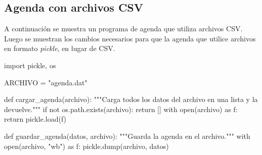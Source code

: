 \newpage
\begin{subappendices}
\section{Agenda con archivos CSV}

A continuación se muestra un programa de agenda que utiliza archivos
CSV\@. Luego se muestran los cambios necesarios para que la agenda que utilice archivos
en formato \emph{pickle}, en lugar de CSV.



\begin{codigo-python}
import pickle, os

ARCHIVO = "agenda.dat"

def cargar_agenda(archivo):
    """Carga todos los datos del archivo en una lista y la devuelve."""
    if not os.path.exists(archivo):
        return []
    with open(archivo) as f:
        return pickle.load(f)

def guardar_agenda(datos, archivo):
    """Guarda la agenda en el archivo."""
    with open(archivo, "wb") as f:
        pickle.dump(archivo, datos)
\end{codigo-python}
\end{subappendices}
